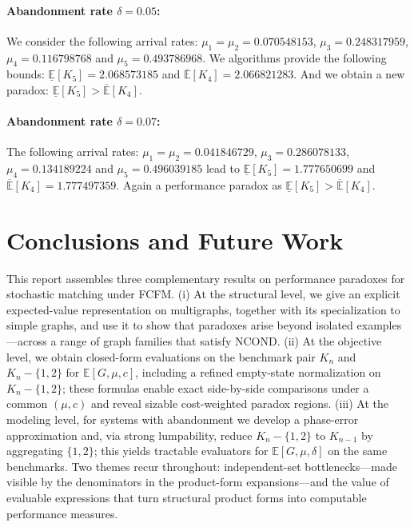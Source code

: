 \documentclass[11pt]{article}
\begin{document}
{\paragraph{Abandonment rate $\delta=0.05$:}
We consider the following arrival rates:
$\mu_1=\mu_2=0.070548153$, 
$\mu_3=0.248317959$, 
$\mu_4=0.116798768$ and $\mu_5=0.493786968$. We algorithms
provide the following bounds: 
$\underline{\mathbb{E}}[K_5] = 2.068573185$ and 
$\overline{\mathbb{E}}[K_4] = 2.066821283$. And we obtain a
new paradox: $\underline{\mathbb{E}}[K_5] > \overline{\mathbb{E}}[K_4]$.

\paragraph{Abandonment rate $\delta=0.07$:}
The following arrival rates:
$\mu_1=\mu_2=0.041846729$, $\mu_3=0.286078133$, 
$\mu_4=0.134189224$ and $\mu_5=0.496039185$
lead to 
$\underline{\mathbb{E}}[K_5] = 1.777650699$ and 
$\overline{\mathbb{E}}[K_4] = 1.777497359$. Again a performance
paradox as $\underline{\mathbb{E}}[K_5] > \overline{\mathbb{E}}[K_4]$.


\section{Conclusions and Future Work}\label{sec:conclusions}

This report assembles three complementary results on performance paradoxes for stochastic matching under \textsc{FCFM}. (i) At the structural level, we give an explicit expected-value representation on multigraphs, together with its specialization to simple graphs, and use it to show that paradoxes arise beyond isolated examples—across a range of graph families that satisfy \textsc{NCOND}. (ii) At the objective level, we obtain closed-form evaluations on the benchmark pair $K_n$ and $K_n-\{1,2\}$ for $\mathbb{E}[G,\mu,c]$, including a refined empty-state normalization on $K_n-\{1,2\}$; these formulas enable exact side-by-side comparisons under a common $(\mu,c)$ and reveal sizable cost-weighted paradox regions. (iii) At the modeling level, for systems with abandonment we develop a phase-error approximation and, via strong lumpability, reduce $K_n-\{1,2\}$ to $K_{n-1}$ by aggregating $\{1,2\}$; this yields tractable evaluators for $\mathbb{E}[G,\mu,\delta]$ on the same benchmarks. Two themes recur throughout: independent-set bottlenecks—made visible by the denominators in the product-form expansions—and the value of evaluable expressions that turn structural product forms into computable performance measures.

}
\end{document}
